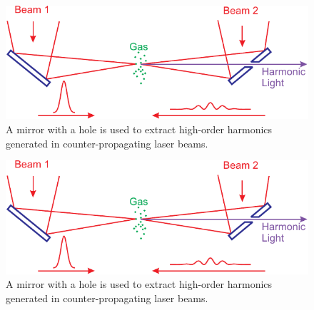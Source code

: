 \documentclass[oneside, astronomy, noacknowlegments]{BYUPhys}
\begin{document}
\begin{figure}
    \centerline{\includegraphics{Graphic1}}
    \caption[Experimental ODMR for SiC]{\label{fig:SiCResults}
     A mirror with a hole is used to extract high-order harmonics generated in
     counter-propagating laser beams.}
 \end{figure}

\begin{figure}
    \centerline{\includegraphics{Graphic1}}
    \caption[Experimental ODMR for CdTe]{\label{fig:CdTeResults}
     A mirror with a hole is used to extract high-order harmonics generated in
     counter-propagating laser beams.}
 \end{figure}


\section{}
\section{}
\end{document}
